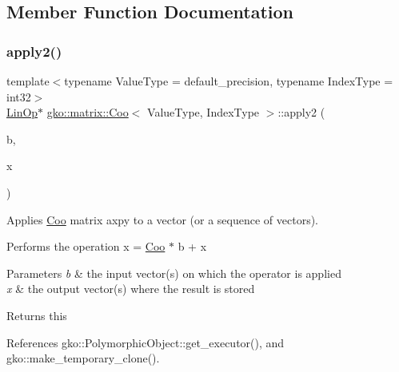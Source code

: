 \subsection{Member Function Documentation}
\mbox{\label{classgko_1_1matrix_1_1Coo_ad2e97eee0ad21f8896f4a82cc5ac8a50}} 
\subsubsection{\texorpdfstring{apply2()}{apply2()}\hspace{0.1cm}{\footnotesize\ttfamily [1/4]}}
{\footnotesize\ttfamily template$<$typename Value\+Type = default\+\_\+precision, typename Index\+Type = int32$>$ \\
\hyperlink{classgko_1_1LinOp}{Lin\+Op}$\ast$ \hyperlink{classgko_1_1matrix_1_1Coo}{gko\+::matrix\+::\+Coo}$<$ Value\+Type, Index\+Type $>$\+::apply2 (\begin{DoxyParamCaption}\item[{const \hyperlink{classgko_1_1LinOp}{Lin\+Op} $\ast$}]{b,  }\item[{\hyperlink{classgko_1_1LinOp}{Lin\+Op} $\ast$}]{x }\end{DoxyParamCaption})\hspace{0.3cm}{\ttfamily [inline]}}



Applies \hyperlink{classgko_1_1matrix_1_1Coo}{Coo} matrix axpy to a vector (or a sequence of vectors). 

Performs the operation x = \hyperlink{classgko_1_1matrix_1_1Coo}{Coo} $\ast$ b + x


\begin{DoxyParams}{Parameters}
{\em b} & the input vector(s) on which the operator is applied \\
\hline
{\em x} & the output vector(s) where the result is stored\\
\hline
\end{DoxyParams}
\begin{DoxyReturn}{Returns}
this 
\end{DoxyReturn}


References gko\+::\+Polymorphic\+Object\+::get\+\_\+executor(), and gko\+::make\+\_\+temporary\+\_\+clone().

\mbox{\label{classgko_1_1matrix_1_1Coo_a48b3fd46edc8b1770f2800e94871eb41}} 
